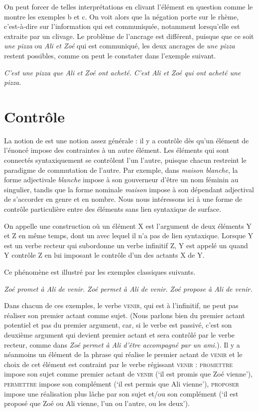 {On peut forcer de telles interprétations en clivant l’élément en question comme le montre les exemples b et c. On voit alors que la négation porte sur le rhème, c’est-à-dire sur l’information qui est communiquée, notamment lorsqu’elle est extraite par un clivage. Le problème de l’ancrage est différent, puisque que ce soit \textit{une pizza} ou \textit{Ali et Zoé} qui est communiqué, les deux ancrages de \textit{une pizza} restent possibles, comme on peut le constater dans l’exemple suivant.

\ea
\ea \textit{C’est une pizza que Ali et Zoé ont acheté.}
\ex \textit{C’est Ali et Zoé qui ont acheté une pizza.}\z\z}

\section{Contrôle}
\label{sec:13-controle}
La notion de  est une notion assez générale : il y a contrôle dès qu’un élément de l’énoncé impose des contraintes à un autre élément. Les éléments qui sont connectés syntaxiquement se contrôlent l’un l’autre, puisque chacun restreint le paradigme de commutation de l’autre. Par exemple, dans \textit{maison blanche}, la forme adjectivale \textit{blanche} impose à son gouverneur d’être un nom féminin au singulier, tandis que la forme nominale \textit{maison} impose à son dépendant adjectival de s’accorder en genre et en nombre. Nous nous intéressons ici à une forme de contrôle particulière entre des éléments sans lien syntaxique de surface.

{On appelle  une construction où un élément X est l’argument de deux éléments Y et Z en même temps, dont un avec lequel il n’a pas de lien syntaxique. Lorsque Y est un verbe recteur qui subordonne un verbe infinitif Z, Y est appelé un  quand Y contrôle Z en lui imposant le contrôle d’un des actants X de Y.}

Ce phénomène est illustré par les exemples classiques suivants.

\ea\label{ex:13-venir}
\ea\textit{Zoé promet à Ali de venir.}
\ex\textit{Zoé permet à Ali de venir.}
\ex\textit{Zoé propose à Ali de venir.}\z\z

Dans chacun de ces exemples, le verbe \textsc{venir}, qui est à l’infinitif, ne peut pas réaliser son premier actant comme sujet. (Nous parlons bien du premier actant potentiel et pas du premier argument, car, si le verbe est passivé, c’est son deuxième argument qui devient premier actant et sera contrôlé par le verbe recteur, comme dans \textit{Zoé permet à Ali d’être accompagné par un ami.}). Il y a néanmoins un élément de la phrase qui réalise le premier actant de \textsc{venir} et le choix de cet élément est contraint par le verbe régissant \textsc{venir} : \textsc{promettre} impose son sujet comme premier actant de \textsc{venir}  (‘il est promis que Zoé vienne’), \textsc{permettre} impose son complément  (‘il est permis que Ali vienne’), \textsc{proposer} impose une réalisation plus lâche par son sujet et/ou son complément  (‘il est proposé que Zoé ou Ali vienne, l’un ou l’autre, ou les deux’).

